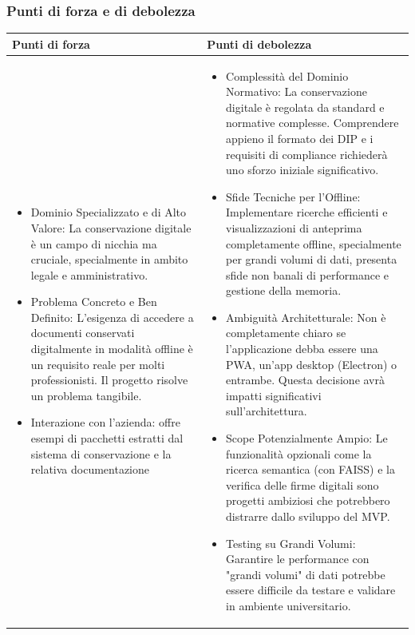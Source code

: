 \documentclass[a4paper,11pt]{article}
\begin{document}
\subsubsection{Punti di forza e di debolezza}
\begin{tabularx}{\textwidth}{|X|X|}
\hline
\rowcolor{lightgray!40} %
\textbf{Punti di forza} & \textbf{Punti di debolezza} \\
\hline
\begin{itemize}
\item Dominio Specializzato e di Alto Valore: La conservazione digitale è un campo di nicchia ma cruciale, specialmente in ambito legale e amministrativo.
\item Problema Concreto e Ben Definito: L'esigenza di accedere a documenti conservati digitalmente in modalità offline è un requisito reale per molti professionisti. Il progetto risolve un problema tangibile.
\item Interazione con l’azienda: offre esempi di pacchetti estratti dal sistema di conservazione e la relativa documentazione
\end{itemize}
 & \begin{itemize}
\item Complessità del Dominio Normativo: La conservazione digitale è regolata da standard e normative complesse. Comprendere appieno il formato dei DIP e i requisiti di compliance richiederà uno sforzo iniziale significativo.
\item Sfide Tecniche per l'Offline: Implementare ricerche efficienti e visualizzazioni di anteprima completamente offline, specialmente per grandi volumi di dati, presenta sfide non banali di performance e gestione della memoria.

\item Ambiguità Architetturale: Non è completamente chiaro se l'applicazione debba essere una PWA, un'app desktop (Electron) o entrambe. Questa decisione avrà impatti significativi sull'architettura.
\item Scope Potenzialmente Ampio: Le funzionalità opzionali come la ricerca semantica (con FAISS) e la verifica delle firme digitali sono progetti ambiziosi che potrebbero distrarre dallo sviluppo del MVP.
\item Testing su Grandi Volumi: Garantire le performance con "grandi volumi" di dati potrebbe essere difficile da testare e validare in ambiente universitario.
\end{itemize} \\
\hline
\end{tabularx}
\end{document}
